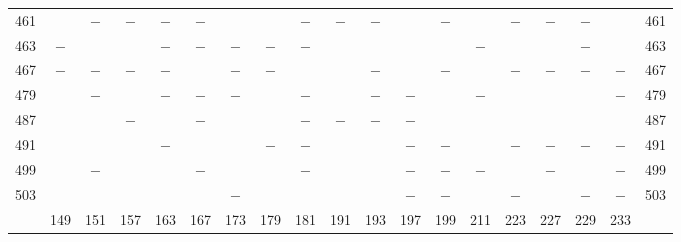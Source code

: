 \begin{center}
\begin{tabular}{r|c|c|c|c|c|c|c|c|c|c|c|c|c|c|c|c|c|r}
461 &  & $-$ & $-$ & $-$ & $-$ &  &  & $-$ & $-$ & $-$ &  & $-$ &  & $-$ & $-$ & $-$ &  & 461\\
463 & $-$ &  &  & $-$ & $-$ & $-$ & $-$ & $-$ &  &  &  &  & $-$ &  &  & $-$ &  & 463\\
467 & $-$ & $-$ & $-$ & $-$ &  & $-$ & $-$ &  &  & $-$ &  & $-$ &  & $-$ & $-$ & $-$ & $-$ & 467\\
479 &  & $-$ &  & $-$ & $-$ & $-$ &  & $-$ &  & $-$ & $-$ &  & $-$ &  &  &  & $-$ & 479\\
487 &  &  & $-$ &  & $-$ &  &  & $-$ & $-$ & $-$ & $-$ &  &  &  &  &  &  & 487\\
491 &  &  &  & $-$ &  &  & $-$ & $-$ &  &  & $-$ & $-$ &  & $-$ & $-$ & $-$ & $-$ & 491\\
499 &  & $-$ &  &  & $-$ &  &  & $-$ &  &  & $-$ & $-$ & $-$ &  & $-$ &  & $-$ & 499\\
503 &  &  &  &  &  & $-$ &  &  &  &  & $-$ & $-$ &  & $-$ &  & $-$ & $-$ & 503\\
\hline
 & 149 & 151 & 157 & 163 & 167 & 173 & 179 & 181 & 191 & 193 & 197 & 199 & 211 & 223 & 227 & 229 & 233 & \\
\hline
\end{tabular}\endgroup\end{center}
\clearpage
